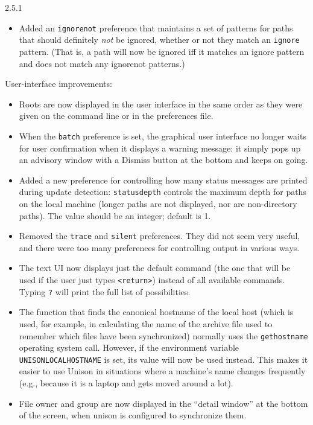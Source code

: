 \begin{changesfromversion}{2.5.1}
\begin{itemize}
\item Added an \verb|ignorenot| preference that maintains a set of patterns 
  for paths that should definitely {\em not} be ignored, whether or not
  they match an \verb|ignore| pattern.  (That is, a path will now be ignored
  iff it matches an ignore pattern and does not match any ignorenot patterns.)
\end{itemize}
  
\item User-interface improvements:
\begin{itemize}
\item Roots are now displayed in the user interface in the same order
as they were given on the command line or in the preferences file.
\item When the \verb|batch| preference is set, the graphical user interface no 
  longer waits for user confirmation when it displays a warning message: it
  simply pops up an advisory window with a Dismiss button at the bottom and
  keeps on going.
\item Added a new preference for controlling how many status messages are
  printed during update detection: \verb|statusdepth| controls the maximum
  depth for paths on the local machine (longer paths are not displayed, nor
  are non-directory paths).  The value should be an integer; default is 1.  
\item Removed the \verb|trace| and \verb|silent| preferences.  They did
not seem very useful, and there were too many preferences for controlling
output in various ways.
\item The text UI now displays just the default command (the one that
will be used if the user just types \verb|<return>|) instead of all
available commands.  Typing \verb|?| will print the full list of
possibilities.
\item The function that finds the canonical hostname of the local host
(which is used, for example, in calculating the name of the archive file
used to remember which files have been synchronized) normally uses the
\verb|gethostname| operating system call.  However, if the environment
variable \verb|UNISONLOCALHOSTNAME| is set, its value will now be used
instead.  This makes it easier to use Unison in situations where a
machine's name changes frequently (e.g., because it is a laptop and gets
moved around a lot).
\item File owner and group are now displayed in the ``detail window'' at
the bottom of the screen, when unison is configured to synchronize them.
\end{itemize}


\end{changesfromversion}
